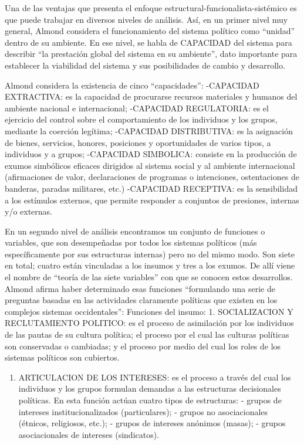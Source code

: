 \documentclass[
]{book}
\providecommand{\tightlist}{%
  \setlength{\itemsep}{0pt}\setlength{\parskip}{0pt}}
\begin{document}
Una de las ventajas que presenta el enfoque estructural-funcionalista-sistémico es que puede trabajar en diversos niveles de análisis. Así, en un primer nivel muy general, Almond considera el funcionamiento del sistema político como ``unidad'' dentro de su ambiente. En ese nivel, se habla de CAPACIDAD del sistema para describir ``la prestación global del sistema en su ambiente'', dato importante para establecer la viabilidad del sistema y sus posibilidades de cambio y desarrollo.

Almond considera la existencia de cinco ``capacidades'': -CAPACIDAD EXTRACTIVA: es la capacidad de procurarse recursos materiales y humanos del ambiente nacional e internacional; -CAPACIDAD REGULATORIA: es el ejercicio del control sobre el comportamiento de los individuos y los grupos, mediante la coerción legítima; -CAPACIDAD DISTRIBUTIVA: es la asignación de bienes, servicios, honores, posiciones y oportunidades de varios tipos, a individuos y a grupos; -CAPACIDAD SIMBOLICA: consiste en la producción de exumos simbólicos eficaces dirigidos al sistema social y al ambiente internacional (afirmaciones de valor, declaraciones de programas o intenciones, ostentaciones de banderas, paradas militares, etc.) -CAPACIDAD RECEPTIVA: es la sensibilidad a los estímulos externos, que permite responder a conjuntos de presiones, internas y/o externas.

En un segundo nivel de análisis encontramos un conjunto de funciones o variables, que son desempeñadas por todos los sistemas políticos (más específicamente por sus estructuras internas) pero no del mismo modo. Son siete en total; cuatro están vinculadas a los insumos y tres a los exumos. De allí viene el nombre de ``teoría de las siete variables'' con que se conocen estos desarrollos. Almond afirma haber determinado esas funciones ``formulando una serie de preguntas basadas en las actividades claramente políticas que existen en los complejos sistemas occidentales'': Funciones del insumo: 1. SOCIALIZACION Y RECLUTAMIENTO POLITICO: es el proceso de asimilación por los individuos de las pautas de su cultura política; el proceso por el cual las culturas políticas son conservadas o cambiadas; y el proceso por medio del cual los roles de los sistemas políticos son cubiertos.

\begin{enumerate}
\def\labelenumi{\arabic{enumi}.}
\setcounter{enumi}{1}
\tightlist
\item
  ARTICULACION DE LOS INTERESES: es el proceso a través del cual los individuos y los grupos formulan demandas a las estructuras decisionales políticas. En esta función actúan cuatro tipos de estructuras: - grupos de intereses institucionalizados (particulares); - grupos no asociacionales (étnicos, religiosos, etc.); - grupos de intereses anónimos (masas); - grupos asociacionales de intereses (sindicatos).
\end{enumerate}
\end{document}
